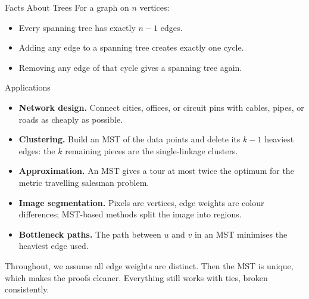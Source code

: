\documentclass[10pt,aspectratio=169]{beamer}
\begin{document}
\begin{frame}{Facts About Trees}
  For a graph on $n$ vertices:

  \begin{itemize}
    \item Every spanning tree has exactly $n - 1$ edges.
    \item Adding any edge to a spanning tree creates \alert{exactly one}
          cycle.
    \item Removing any edge of that cycle gives a spanning tree again.
  \end{itemize}

  \begin{center}
  \end{center}

\end{frame}

\begin{frame}{Applications}
  \begin{itemize}
    \item \textbf{Network design.} Connect cities, offices, or circuit pins
          with cables, pipes, or roads as cheaply as possible.
    \item \textbf{Clustering.} Build an MST of the data points and delete its
          $k - 1$ heaviest edges: the $k$ remaining pieces are the
          single-linkage clusters.
    \item \textbf{Approximation.} An MST gives a tour at most twice the
          optimum for the metric travelling salesman problem.
    \item \textbf{Image segmentation.} Pixels are vertices, edge weights are
          colour differences; MST-based methods split the image into regions.
    \item \textbf{Bottleneck paths.} The path between $u$ and $v$ in an MST
          minimises the heaviest edge used.
  \end{itemize}

  \bigskip
  \small Throughout, we assume all edge weights are \alert{distinct}. Then the
  MST is unique, which makes the proofs cleaner. Everything still works with
  ties, broken consistently.
\end{frame}
\end{document}

